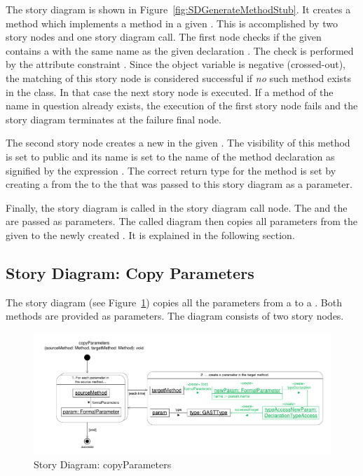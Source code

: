 The story diagram  is shown in Figure~\ref{fig:SDGenerateMethodStub}. It creates a method which implements a method  in a given . This is accomplished by two story nodes and one story diagram call. The first node checks if the given  contains a  with the same name as the given declaration . The check is performed by the attribute constraint . Since the object variable  is negative (crossed-out), the matching of this story node is considered successful if \emph{no} such method exists in the class. In that case the next story node is executed. If a method of the name in question already exists, the execution of the first story node fails and the story diagram terminates at the failure final node.

The second story node creates a new  in the given . The visibility of this method is set to public and its name is set to the name of the method declaration as signified by the expression . The correct return type for the method is set by creating a  from the  to the  that was passed to this story diagram as a parameter.

Finally, the story diagram  is called in the story diagram call node. The  and the  are passed as parameters. The called diagram then copies all parameters from the given  to the newly created . It is explained in the following section.

\subsection{Story Diagram: Copy Parameters} \label{sec:SDCopyParameters}

The story diagram  (see Figure~\ref{fig:SDCopyParameters}) copies all the parameters from a  to a . Both methods are provided as parameters. The diagram consists of two story nodes.

\begin{figure}[hbtp]
\centering
\includegraphics[width=0.9\linewidth]{./figures/SDCopyParameters}
\caption{Story Diagram: copyParameters}
\label{fig:SDCopyParameters}
\end{figure}

